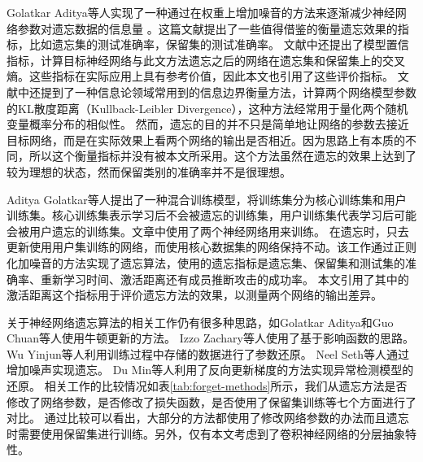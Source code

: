 Golatkar Aditya等人\cite{Golatkar_2020_CVPR}实现了一种通过在权重上增加噪音的方法来逐渐减少神经网络参数对遗忘数据的信息量
。这篇文献提出了一些值得借鉴的衡量遗忘效果的指标，比如遗忘集的测试准确率，保留集的测试准确率。
文献中还提出了模型置信指标，计算目标神经网络与此文方法遗忘之后的网络在遗忘集和保留集上的交叉熵。这些指标在实际应用上具有参考价值，因此本文也引用了这些评价指标。
文献中还提到了一种信息论领域常用到的信息边界衡量方法，计算两个网络模型参数的KL散度距离（Kullback-Leibler Divergence），这种方法经常用于量化两个随机变量概率分布的相似性。
然而，遗忘的目的并不只是简单地让网络的参数去接近目标网络，而是在实际效果上看两个网络的输出是否相近。因为思路上有本质的不同，所以这个衡量指标并没有被本文所采用。这个方法虽然在遗忘的效果上达到了较为理想的状态，然而保留类别的准确率并不是很理想。

Aditya Golatkar等人\cite{Golatkar_2021_CVPR}提出了一种混合训练模型，将训练集分为核心训练集和用户训练集。核心训练集表示学习后不会被遗忘的训练集，用户训练集代表学习后可能会被用户遗忘的训练集。文章中使用了两个神经网络用来训练。
在遗忘时，只去更新使用用户集训练的网络，而使用核心数据集的网络保持不动。该工作通过正则化加噪音的方法实现了遗忘算法，使用的遗忘指标是遗忘集、保留集和测试集的准确率、重新学习时间、激活距离还有成员推断攻击的成功率。
本文引用了其中的激活距离这个指标用于评价遗忘方法的效果，以测量两个网络的输出差异。

关于神经网络遗忘算法的相关工作仍有很多种思路，如Golatkar Aditya\cite{10.1007/978-3-030-58526-6_23}和Guo Chuan\cite{pmlr-v119-guo20c}等人使用牛顿更新的方法。
Izzo Zachary等人\cite{pmlr-v130-izzo21a}使用了基于影响函数\cite{pmlr-v70-koh17a,cook_weisberg_1982}的思路。
Wu Yinjun等人\cite{pmlr-v119-wu20b}利用训练过程中存储的数据进行了参数还原。
Neel Seth等人\cite{pmlr-v132-neel21a}通过增加噪声实现遗忘。
Du Min等人\cite{10.1145/3319535.3363226}利用了反向更新梯度的方法实现异常检测模型的还原。
相关工作的比较情况如表\ref{tab:forget-methods}所示，我们从遗忘方法是否修改了网络参数，是否修改了损失函数，是否使用了保留集训练等七个方面进行了对比。
通过比较可以看出，大部分的方法都使用了修改网络参数的办法而且遗忘时需要使用保留集进行训练。另外，仅有本文考虑到了卷积神经网络的分层抽象特性。

